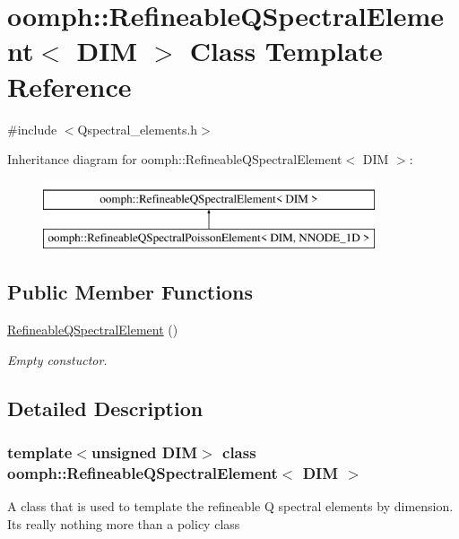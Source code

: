 \hypertarget{classoomph_1_1RefineableQSpectralElement}{}\section{oomph\+:\+:Refineable\+Q\+Spectral\+Element$<$ D\+IM $>$ Class Template Reference}
\label{classoomph_1_1RefineableQSpectralElement}


{\ttfamily \#include $<$Qspectral\+\_\+elements.\+h$>$}

Inheritance diagram for oomph\+:\+:Refineable\+Q\+Spectral\+Element$<$ D\+IM $>$\+:\begin{figure}[H]
\begin{center}
\leavevmode
\includegraphics[height=2.000000cm]{classoomph_1_1RefineableQSpectralElement}
\end{center}
\end{figure}
\subsection*{Public Member Functions}
\begin{DoxyCompactItemize}
\item 
\hyperlink{classoomph_1_1RefineableQSpectralElement_a3aadaaf14de4547a54d04539bf0d1f76}{Refineable\+Q\+Spectral\+Element} ()
\begin{DoxyCompactList}\small\item\em Empty constuctor. \end{DoxyCompactList}\end{DoxyCompactItemize}


\subsection{Detailed Description}
\subsubsection*{template$<$unsigned D\+IM$>$\newline
class oomph\+::\+Refineable\+Q\+Spectral\+Element$<$ D\+I\+M $>$}

A class that is used to template the refineable Q spectral elements by dimension. It\textquotesingle{}s really nothing more than a policy class 

